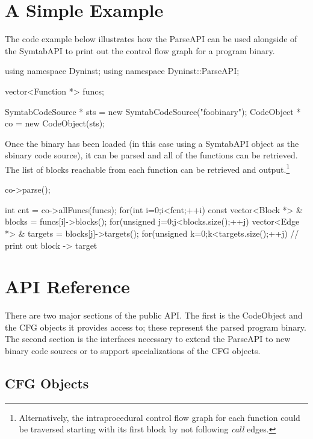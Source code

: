 \documentclass{tufte-handout}
\begin{document}
\section{A Simple Example}

The code example below illustrates how the ParseAPI can be used alongside of
the SymtabAPI to print out the control flow graph for a program binary.
\begin{listing}[1]{1}
using namespace Dyninst;
using namespace Dyninst::ParseAPI;

vector<Function *> funcs;

SymtabCodeSource * sts = new SymtabCodeSource("foobinary");
CodeObject * co = new CodeObject(sts);
\end{listing}
\noindent
Once the binary has been loaded (in this case using a SymtabAPI object as the
sbinary code source), it can be parsed and all of the functions can be
retrieved. The list of blocks reachable from each function can be retrieved
and output.\footnote{Alternatively, the intraprocedural control flow graph
for each function could be traversed starting with its first block by not
following \emph{call} edges.}

\begin{listingcont}
co->parse();

int cnt = co->allFuncs(funcs);
for(int i=0;i<fcnt;++i) {
    const vector<Block *> & blocks = funcs[i]->blocks();
    for(unsigned j=0;j<blocks.size();++j) {
        vector<Edge *> & targets = blocks[j]->targets();
        for(unsigned k=0;k<targets.size();++j) {
            // print out block -> target
        }
    }
}
\end{listingcont}

\section{API Reference}

There are two major sections of the public API. The first is the CodeObject and
the CFG objects it provides access to; these represent the parsed program
binary. The second section is the interfaces necessary to extend the ParseAPI
to new binary code sources or to support specializations of the CFG objects.

\subsection{CFG Objects}
\end{document}
